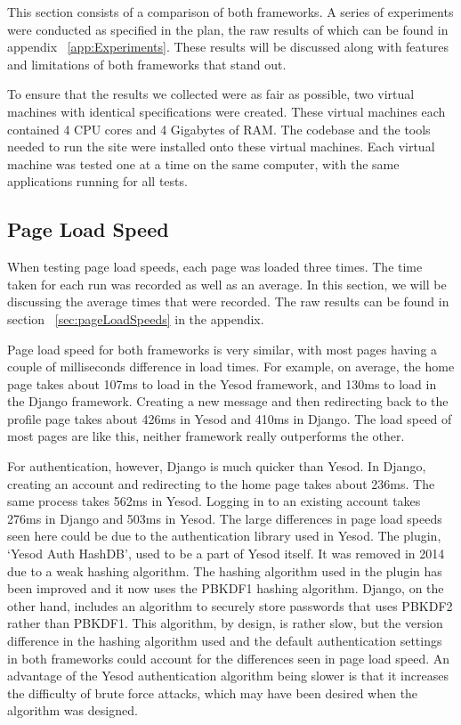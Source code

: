 This section consists of a comparison of both frameworks. A series of experiments
were conducted as specified in the plan, the raw results of which can be found
in appendix ~\ref{app:Experiments}. These results will be discussed along with
features and limitations of both frameworks that stand out.

To ensure that the results we collected were as fair as possible, two virtual
machines with identical specifications were created. These virtual machines
each contained 4 CPU cores and 4 Gigabytes of RAM. The codebase and the tools
needed to run the site were installed onto these virtual machines. Each
virtual machine was tested one at a time on the same computer, with the
same applications running for all tests.

\subsection{Page Load Speed}

When testing page load speeds, each page was loaded three times. The time
taken for each run was recorded as well as an average. In this section,
we will be discussing the average times that were recorded. The raw
results can be found in section ~\ref{sec:pageLoadSpeeds} in the appendix.

Page load speed for both frameworks is very similar, with most pages having a
couple of milliseconds difference in load times. For example, on average, the home page
takes about 107ms to load in the Yesod framework, and 130ms to load in the
Django framework. Creating a new message and then redirecting back to the
profile page takes about 426ms in Yesod and 410ms in Django. The load speed
of most pages are like this, neither framework really outperforms the other.

For authentication, however, Django is much quicker than Yesod. In Django,
creating an account and redirecting to the home page takes about 236ms. The
same process takes 562ms in Yesod. Logging in to an existing account takes
276ms in Django and 503ms in Yesod. The large differences in page load speeds
seen here could be due to the authentication library used in Yesod.
The plugin, `Yesod Auth HashDB', used
to be a part of Yesod itself. It was removed in 2014 due to a weak hashing
algorithm. The hashing algorithm used in the plugin has been improved and
it now uses the PBKDF1 hashing algorithm.
Django, on the other hand, includes an algorithm to securely store passwords
that uses PBKDF2 rather than PBKDF1. This algorithm, by design, is rather
slow, but the version difference in the hashing algorithm used and the
default authentication settings in both frameworks could account for the
differences seen in page load speed. An advantage of the Yesod authentication
algorithm being slower is that it increases the difficulty of brute force attacks,
which may have been desired when the algorithm was designed. \parencite{hashdbRepo,lastpassPasswordIterations}

